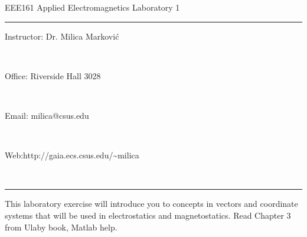 \documentclass[]{report}
\begin{document}
\noindent



\centerline{\Large{EEE161 Applied Electromagnetics Laboratory 1}}


\vspace{0.3cm}

\noindent
\rule[.5mm]{\textwidth}{.5mm}

\noindent
\centerline{Instructor: Dr. Milica Markovi{\'c}} \\
\centerline{Office: Riverside Hall 3028} \\
\centerline{Email: milica@csus.edu} \\
\centerline{Web:http://gaia.ecs.csus.edu/\~{}milica}\


\noindent
\rule[.5mm]{\textwidth}{.5mm}


\vspace*{0.2cm}

This laboratory exercise will introduce you to concepts in vectors and coordinate systems that will be used in electrostatics and magnetostatics. Read Chapter 3 from Ulaby book, Matlab help.
\end{document}
